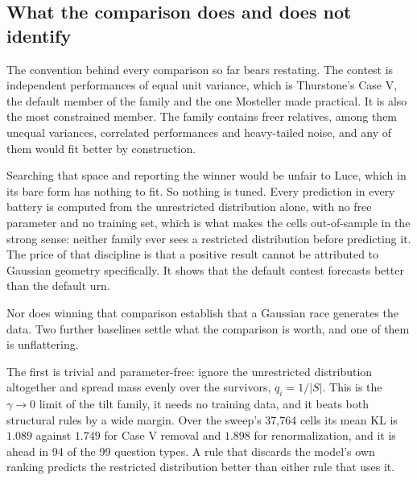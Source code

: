 \documentclass[11pt]{article}
\begin{document}
\subsection{What the comparison does and does not identify}
\label{sec:tilt}

The convention behind every comparison so far bears restating. The contest is
independent
performances of equal unit variance, which is Thurstone's Case V, the default
member of the family and the one Mosteller \cite{mosteller1951} made
practical. It is also the most constrained member. The family contains freer
relatives, among them unequal variances, correlated performances and
heavy-tailed noise, and any of them would fit better by construction.

Searching that space and reporting the winner would be unfair to Luce, which
in its bare form has nothing to fit. So nothing is tuned. Every prediction in
every battery is computed from the unrestricted distribution alone, with no
free parameter and no training set, which is what makes the cells out-of-sample
in the strong sense: neither family ever sees a restricted distribution before
predicting it. The price of that discipline is that a positive result cannot be
attributed to Gaussian geometry specifically. It shows that the default
contest forecasts better than the default urn.

Nor does winning that comparison establish that a Gaussian race generates the
data. Two further baselines settle what the comparison is worth, and one of
them is unflattering.

The first is trivial and parameter-free: ignore the unrestricted distribution
altogether and spread mass evenly over the survivors, $q_i = 1/|S|$. This is
the $\gamma \to 0$ limit of the tilt family, it needs no training data, and it
beats both structural rules by a wide margin. Over the sweep's 37{,}764 cells
its mean KL is $1.089$ against $1.749$ for Case V removal and $1.898$ for
renormalization, and it is ahead in 94 of the 99 question types. A rule that
discards the model's own ranking predicts the restricted distribution better
than either rule that uses it.
\end{document}
